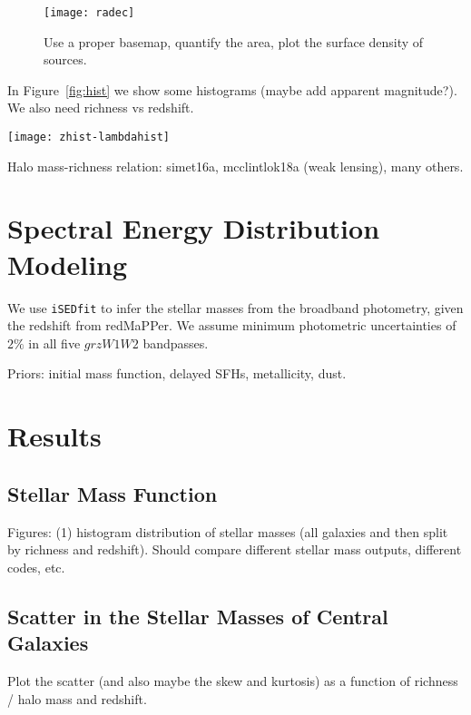 \documentclass[twocolumn]{aastex62}
\newcommand\redmapper{redMaPPer}
\newcommand\isedfit{\texttt{iSEDfit}}
\begin{document}
\begin{figure}
\centering\texttt{[image: radec]}
\caption{Use a proper basemap, quantify the area, plot the surface density of sources.\label{fig:radec}}
\end{figure}

In Figure~\ref{fig:hist} we show some histograms (maybe add apparent magnitude?).  We also need richness vs redshift.

\begin{figure*}
\centering\texttt{[image: zhist-lambdahist]}
\caption{(\emph{Left}) Redshift and (\emph{right}) and cluster richness distribution for the sample. \label{fig:hist}}
\end{figure*}

Halo mass-richness relation: simet16a, mcclintlok18a (weak lensing), many others.  

\section{Spectral Energy Distribution Modeling}\label{sec:mass}

We use \isedfit{} to infer the stellar masses from the broadband photometry, given the redshift from \redmapper.  We assume minimum photometric uncertainties of $2\%$ in all five $grzW1W2$ bandpasses.  

Priors:  \citet{chabrier03a} initial mass function, delayed SFHs, metallicity, dust.

\section{Results}\label{sec:results}

\subsection{Stellar Mass Function}\label{sec:smf}

Figures: (1) histogram distribution of stellar masses (all galaxies and then split by richness and redshift).  Should compare different stellar mass outputs, different codes, etc.

\subsection{Scatter in the Stellar Masses of Central Galaxies}\label{sec:scatter} 

Plot the scatter (and also maybe the skew and kurtosis) as a function of richness / halo mass and redshift.
\end{document}
